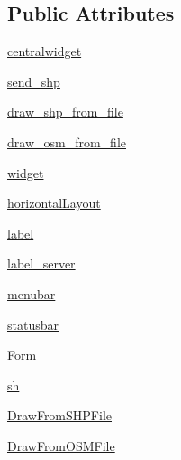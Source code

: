 \subsection*{Public Attributes}
\begin{DoxyCompactItemize}
\item 
\hyperlink{classsrc_1_1client_1_1gui_1_1client__main_1_1Ui__MainWindow_a293c710255ce97cbf8777f36b369a911}{centralwidget}
\item 
\hyperlink{classsrc_1_1client_1_1gui_1_1client__main_1_1Ui__MainWindow_a59cc3cc5d82dc7931242deb9157a0acf}{send\_\-shp}
\item 
\hyperlink{classsrc_1_1client_1_1gui_1_1client__main_1_1Ui__MainWindow_ae88022c9bb9422dec0d79c6bc47ddfa5}{draw\_\-shp\_\-from\_\-file}
\item 
\hyperlink{classsrc_1_1client_1_1gui_1_1client__main_1_1Ui__MainWindow_a7c972e3d0932c958efeeb703ec62af8c}{draw\_\-osm\_\-from\_\-file}
\item 
\hyperlink{classsrc_1_1client_1_1gui_1_1client__main_1_1Ui__MainWindow_ae6326ea0e448535ddce717d41dd74d77}{widget}
\item 
\hyperlink{classsrc_1_1client_1_1gui_1_1client__main_1_1Ui__MainWindow_abcd85ea2373a402ff3ff032d6ff4e701}{horizontalLayout}
\item 
\hyperlink{classsrc_1_1client_1_1gui_1_1client__main_1_1Ui__MainWindow_a201116d69ef3d0c4d55742c1ef8245c6}{label}
\item 
\hyperlink{classsrc_1_1client_1_1gui_1_1client__main_1_1Ui__MainWindow_a7350075e9f56828cf9e8dfb8364cee4a}{label\_\-server}
\item 
\hyperlink{classsrc_1_1client_1_1gui_1_1client__main_1_1Ui__MainWindow_a0ceb1512ce9be242b5bcc79f5e6cb438}{menubar}
\item 
\hyperlink{classsrc_1_1client_1_1gui_1_1client__main_1_1Ui__MainWindow_a78cf83322a3b146f95758fcadecbb0c7}{statusbar}
\item 
\hyperlink{classsrc_1_1client_1_1gui_1_1client__main_1_1Ui__MainWindow_aecd5951cbde22406bdd14fefeee9b468}{Form}
\item 
\hyperlink{classsrc_1_1client_1_1gui_1_1client__main_1_1Ui__MainWindow_a5a75dff52a6fd3d0f75398a7546c2073}{sh}
\item 
\hyperlink{classsrc_1_1client_1_1gui_1_1client__main_1_1Ui__MainWindow_aea87b7ffaa0dcbf286648f262ce46548}{DrawFromSHPFile}
\item 
\hyperlink{classsrc_1_1client_1_1gui_1_1client__main_1_1Ui__MainWindow_a0fd479a8612e05cd4ba2cb3b8f904d26}{DrawFromOSMFile}
\end{DoxyCompactItemize}



